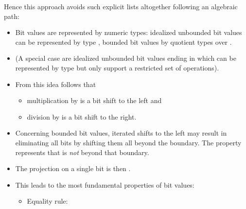 \begin{isabellebody}
\begin{isamarkuptext}
Hence this approach avoids such explicit lists altogether
following an algebraic path:

%
\begin{itemize}%
\item Bit values are represented by numeric types: idealized
unbounded bit values can be represented by type ,
bounded bit values by quotient types over .

\item (A special case are idealized unbounded bit values ending
in  which can be represented by type  but
only support a restricted set of operations).

\item From this idea follows that

%
\begin{itemize}%
\item multiplication by  is a bit shift to the left and

\item division by  is a bit shift to the right.%
\end{itemize}

\item Concerning bounded bit values, iterated shifts to the left
may result in eliminating all bits by shifting them all
beyond the boundary.  The property 
represents that  is \emph{not} beyond that boundary.

\item The projection on a single bit is then .

\item This leads to the most fundamental properties of bit values:

%
\begin{itemize}%
\item Equality rule: 


\end{itemize}
\end{itemize}
\end{isamarkuptext}
\end{isabellebody}
